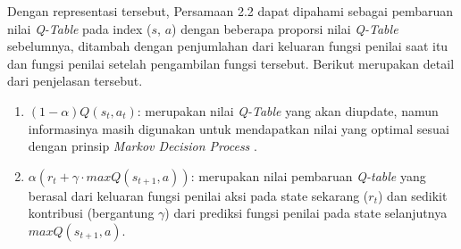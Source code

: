 Dengan representasi tersebut, Persamaan 2.2 dapat dipahami sebagai pembaruan nilai \textit{Q-Table} pada index (\(s\), \(a\)) dengan beberapa proporsi nilai \textit{Q-Table} sebelumnya, ditambah dengan penjumlahan dari keluaran fungsi penilai saat itu dan fungsi penilai setelah pengambilan fungsi tersebut. Berikut merupakan detail dari penjelasan tersebut.


\begin{enumerate}
	\item \((1-\alpha) Q(s_t,a_t)\): merupakan nilai \textit{Q-Table} yang akan diupdate, namun informasinya masih digunakan untuk mendapatkan nilai yang optimal sesuai dengan prinsip \textit{Markov Decision Process} \parencite{littman1994markov}.
	\item \(\alpha (r_t + \gamma \cdot maxQ(s_{t+1},a))\): merupakan nilai pembaruan \textit{Q-table} yang berasal dari keluaran fungsi penilai aksi pada state sekarang (\(r_t\)) dan sedikit kontribusi (bergantung \(\gamma\)) dari prediksi fungsi penilai pada state selanjutnya \(maxQ(s_{t+1},a)\).
\end{enumerate}

